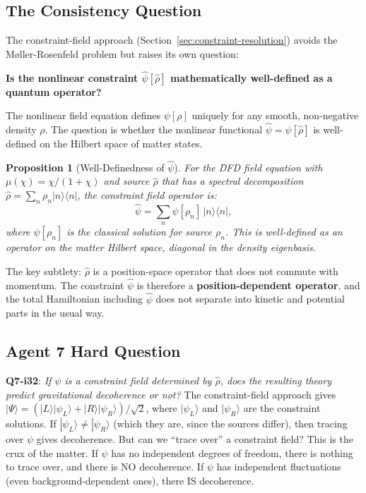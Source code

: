 \documentclass[11pt,a4paper]{article}
\newtheorem{proposition}{Proposition}
\begin{document}
\subsection{The Consistency Question}
\label{sec:consistency}

The constraint-field approach (Section~\ref{sec:constraint-resolution}) avoids the M\o ller-Rosenfeld problem but raises its own question:

\textbf{Is the nonlinear constraint $\hat\psi[\hat\rho]$ mathematically well-defined as a quantum operator?}

The nonlinear field equation defines $\psi[\rho]$ uniquely for any smooth, non-negative density $\rho$. The question is whether the nonlinear functional $\hat\psi = \psi[\hat\rho]$ is well-defined on the Hilbert space of matter states.

\begin{proposition}[Well-Definedness of $\hat\psi$]
For the DFD field equation with $\mu(\chi) = \chi/(1+\chi)$ and source $\hat\rho$ that has a spectral decomposition $\hat\rho = \sum_n \rho_n |n\rangle\langle n|$, the constraint field operator is:
\begin{equation}
\hat\psi = \sum_n \psi[\rho_n]\,|n\rangle\langle n|,
\end{equation}
where $\psi[\rho_n]$ is the classical solution for source $\rho_n$. This is well-defined as an operator on the matter Hilbert space, diagonal in the density eigenbasis.
\end{proposition}

The key subtlety: $\hat\rho$ is a position-space operator that does not commute with momentum. The constraint $\hat\psi$ is therefore a \textbf{position-dependent operator}, and the total Hamiltonian including $\hat\psi$ does not separate into kinetic and potential parts in the usual way.

\subsection{Agent 7 Hard Question}

\textbf{Q7-i32}: \emph{If $\psi$ is a constraint field determined by $\hat\rho$, does the resulting theory predict gravitational decoherence or not?} The constraint-field approach gives $|\Psi\rangle = (|L\rangle|\psi_L\rangle + |R\rangle|\psi_R\rangle)/\sqrt{2}$, where $|\psi_L\rangle$ and $|\psi_R\rangle$ are the constraint solutions. If $|\psi_L\rangle \neq |\psi_R\rangle$ (which they are, since the sources differ), then tracing over $\psi$ gives decoherence. But can we ``trace over'' a constraint field? This is the crux of the matter. If $\psi$ has no independent degrees of freedom, there is nothing to trace over, and there is NO decoherence. If $\psi$ has independent fluctuations (even background-dependent ones), there IS decoherence.
\end{document}
